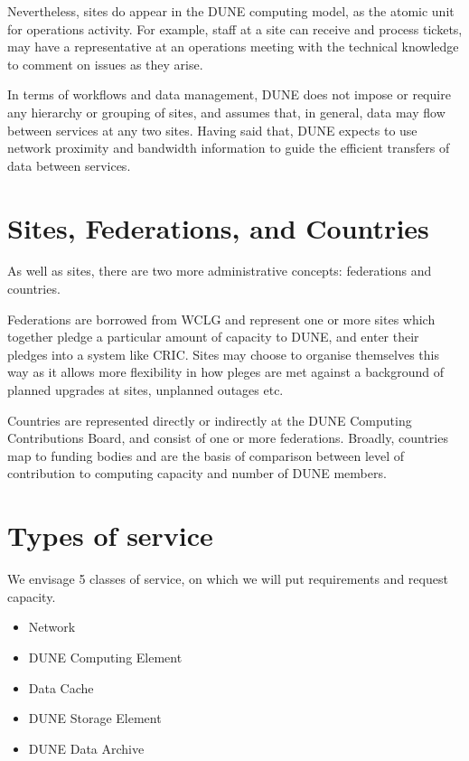Nevertheless, sites do appear in the DUNE computing model, as the atomic unit for operations activity. For example, staff at a site can receive and process tickets, may have a representative at an operations meeting with the technical knowledge to comment on issues as they arise.

In terms of workflows and data management, DUNE does not impose or require any hierarchy or grouping of sites, and assumes that, in general, data may flow between services at any two sites. Having said that, DUNE expects to use network proximity and bandwidth information to guide the efficient transfers of data between services. 

\section{Sites, Federations, and Countries}
\label{sec:cm:federations}

As well as sites, there are two more administrative concepts: federations and countries.

Federations are borrowed from WCLG and represent one or more sites which together pledge a particular amount of capacity to DUNE, and enter their pledges into a system like CRIC. Sites may choose to organise themselves this way as it allows more flexibility in how pleges are met against a background of planned upgrades at sites, unplanned outages etc. 

Countries are represented directly or indirectly at the DUNE Computing Contributions Board, and consist of one or more federations. Broadly, countries map to funding bodies and are the basis of comparison between level of contribution to computing capacity and number of DUNE members.




\section{Types of service}
\label{sec:cm:types_of_service}

We envisage 5 classes of service, on which we will put requirements and request capacity.

\begin{itemize}
    \item Network
    \item DUNE Computing Element
    \item Data Cache
    \item DUNE Storage Element
    \item DUNE Data Archive
\end{itemize}

